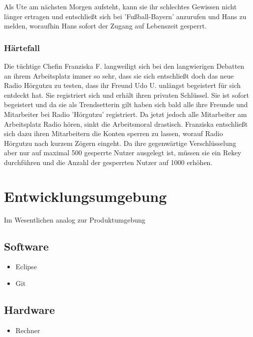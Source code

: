 \documentclass[a4paper,10pt]{scrartcl}
\begin{document}
Als Ute am nächsten Morgen aufsteht, kann sie ihr schlechtes Gewissen nicht länger ertragen und entschließt sich bei 'Fußball-Bayern' anzurufen und Hans zu melden, woraufhin Hans sofort der Zugang auf Lebenszeit gesperrt.

\subsubsection{Härtefall}
Die tüchtige Chefin Franziska F. langweiligt sich bei den langwierigen
Debatten an ihrem Arbeitsplatz immer so sehr, dass sie sich entschließt doch
das neue Radio Hörgutzu zu testen, dass ihr Freund Udo U. unlängst
begeistert für sich entdeckt hat. Sie registriert sich und erhält ihren privaten Schlüssel.
Sie ist sofort begeistert und da sie als Trendsetterin gilt haben sich bald alle ihre Freunde
und Mitarbeiter bei Radio 'Hörgutzu' registriert. Da jetzt jedoch alle Mitarbeiter am Arbeitsplatz
Radio hören, sinkt die Arbeitsmoral drastisch. Franziska entschließt sich dazu ihren Mitarbeitern
die Konten sperren zu lassen, worauf Radio Hörgutzu nach kurzem Zögern eingeht. Da ihre
gegenwärtige Verschlüsselung aber nur auf maximal 500 gesperrte
Nutzer ausgelegt ist, müssen sie ein Rekey durchführen und die Anzahl der gesperrten Nutzer
auf 1000 erhöhen.


\section{Entwicklungsumgebung}
Im Wesentlichen analog zur Produktumgebung

\subsection{Software}
\begin{itemize}
\item Eclipse
\item Git
\end{itemize}
\subsection{Hardware}
\begin{itemize}
\item Rechner
\end{itemize}


\clearpage


{}

\end{document}

